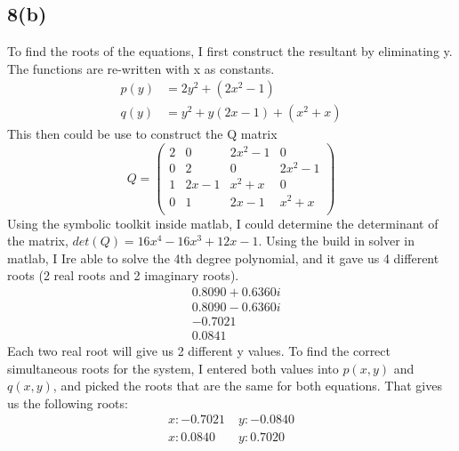 \documentclass{article}
\begin{document}
\subsection*{8(b)}
To find the roots of the equations, I first construct the resultant by eliminating y. The functions are re-written with x as constants.
\begin{equation*}
\begin{aligned}
p(y) &= 2y^2 + (2x^2-1)\\
q(y) &= y^2 + y(2x-1) + (x^2 +x)
\end{aligned}
\end{equation*}
This then could be use to construct the Q matrix
\begin{equation*}
Q = 
\begin{pmatrix}
2 & 0 & 2x^2-1 & 0\\
0 & 2 & 0 & 2x^2 -1 \\
1 & 2x-1 & x^2+x & 0 \\
0 & 1 & 2x-1 & x^2+x\\ 
\end{pmatrix}
\end{equation*}
Using the symbolic toolkit inside matlab, I could determine the determinant of the matrix, $det(Q) = 16x^4 - 16x^3 + 12x - 1$. Using the build in solver in matlab, I Ire able to solve the 4th degree polynomial, and it gave us 4 different roots (2 real roots and 2 imaginary roots).
\begin{equation*}
\begin{aligned}
   &0.8090 + 0.6360i\\
   &0.8090 - 0.6360i\\
  &-0.7021 \\
   &0.0841 
\end{aligned}
\end{equation*}
Each two real root will give us 2 different y values. To find the correct simultaneous roots for the system, I entered both values into $p(x,y)$ and $q(x,y)$, and picked the roots that are the same for both equations. That gives us the following roots:
\begin{equation*}
\begin{aligned}
	x: -0.7021 \;&y:-0.0840\\
	x: 0.0840 \;&y: 0.7020
\end{aligned}
\end{equation*}
\end{document}
